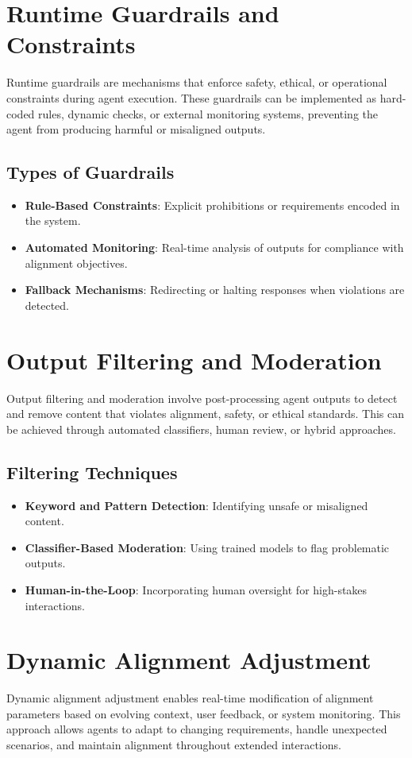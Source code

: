 \begin{TNtwocol}
\section{Runtime Guardrails and Constraints}
Runtime guardrails are mechanisms that enforce safety, ethical, or operational constraints during agent execution. These guardrails can be implemented as hard-coded rules, dynamic checks, or external monitoring systems, preventing the agent from producing harmful or misaligned outputs.

\subsection{Types of Guardrails}
\begin{itemize}
    \item \textbf{Rule-Based Constraints}: Explicit prohibitions or requirements encoded in the system.
    \item \textbf{Automated Monitoring}: Real-time analysis of outputs for compliance with alignment objectives.
    \item \textbf{Fallback Mechanisms}: Redirecting or halting responses when violations are detected.
\end{itemize}

\section{Output Filtering and Moderation}
Output filtering and moderation involve post-processing agent outputs to detect and remove content that violates alignment, safety, or ethical standards. This can be achieved through automated classifiers, human review, or hybrid approaches.

\subsection{Filtering Techniques}
\begin{itemize}
    \item \textbf{Keyword and Pattern Detection}: Identifying unsafe or misaligned content.
    \item \textbf{Classifier-Based Moderation}: Using trained models to flag problematic outputs.
    \item \textbf{Human-in-the-Loop}: Incorporating human oversight for high-stakes interactions.
\end{itemize}

\section{Dynamic Alignment Adjustment}
Dynamic alignment adjustment enables real-time modification of alignment parameters based on evolving context, user feedback, or system monitoring. This approach allows agents to adapt to changing requirements, handle unexpected scenarios, and maintain alignment throughout extended interactions.


\end{TNtwocol}
